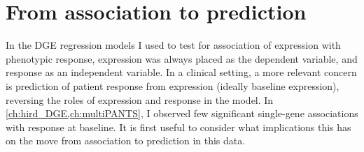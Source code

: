 %
%
%
%

\section{From association to prediction}

In the \gls{DGE} regression models I used to test for association of expression with phenotypic response,
expression was always placed as the dependent variable, 
and response as an independent variable.
In a clinical setting, a more relevant concern is prediction of patient response from expression (ideally baseline expression),
reversing the roles of expression and response in the model.
In \cref{ch:hird_DGE,ch:multiPANTS},
I observed few significant single-gene associations with response at baseline.
It is first useful to consider what implications this has on the move from association to prediction in this data.

